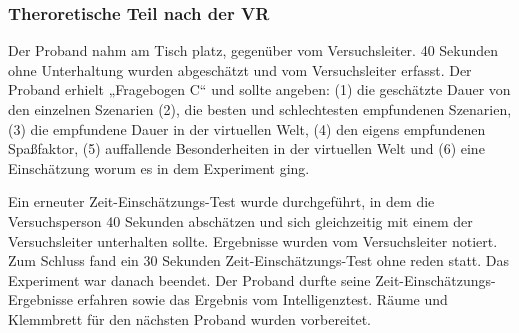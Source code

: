 \documentclass{Paper}
\begin{document}
\subsubsection{Theroretische Teil nach der VR}
Der Proband nahm am Tisch platz, gegenüber vom Versuchsleiter. 40 Sekunden ohne
Unterhaltung wurden abgeschätzt und vom Versuchsleiter erfasst. Der Proband erhielt
„Fragebogen C“ und sollte angeben: (1) die geschätzte Dauer von den einzelnen Szenarien
(2), die besten und schlechtesten empfundenen Szenarien, (3) die empfundene Dauer in
der virtuellen Welt, (4) den eigens empfundenen Spaßfaktor, (5) auffallende
Besonderheiten in der virtuellen Welt und (6) eine Einschätzung worum es in dem
Experiment ging.
\par
Ein erneuter Zeit-Einschätzungs-Test wurde durchgeführt, in dem die
Versuchsperson 40 Sekunden abschätzen und sich gleichzeitig mit einem der Versuchsleiter
unterhalten sollte. Ergebnisse wurden vom Versuchsleiter notiert. Zum Schluss fand ein 30
Sekunden Zeit-Einschätzungs-Test ohne reden statt. Das Experiment war danach beendet.
Der Proband durfte seine Zeit-Einschätzungs-Ergebnisse erfahren sowie das Ergebnis vom
Intelligenztest. Räume und Klemmbrett für den nächsten Proband wurden vorbereitet.
\par
\end{document}
